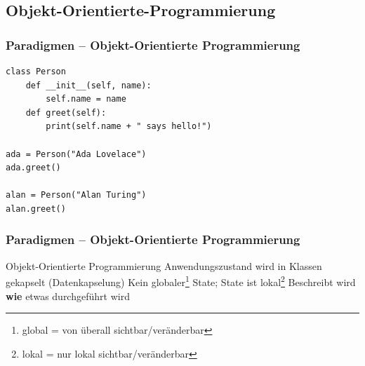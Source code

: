 \subsection{Objekt-Orientierte-Programmierung}%
\begin{frame}[fragile]%
    \frametitle{Paradigmen -- Objekt-Orientierte Programmierung}


    \begin{minipage} {\linewidth}\vspace{.3em}%
    \begin{verbatim}
class Person
    def __init__(self, name):
        self.name = name
    def greet(self):
        print(self.name + " says hello!")

ada = Person("Ada Lovelace")
ada.greet()

alan = Person("Alan Turing")
alan.greet()
\end{verbatim}
\end{minipage}

\end{frame}

\begin{frame}
    \frametitle{Paradigmen -- Objekt-Orientierte Programmierung}
    \begin{outline}
        \0 Objekt-Orientierte Programmierung
            \1 Anwendungszustand wird in Klassen gekapselt (Datenkapselung)
            \2 Kein globaler\footnote{global = von überall sichtbar/veränderbar} State; State ist lokal\footnote{lokal = nur lokal sichtbar/veränderbar}
                \vspace{.3em}
            \1 Beschreibt wird \textbf{wie} etwas durchgeführt wird
        
    \end{outline}
    
\end{frame}


